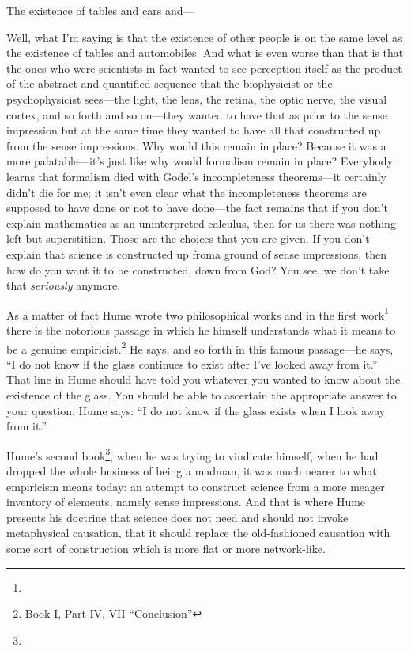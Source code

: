  The existence of tables and cars and--- 

 Well, what I'm saying is that the existence of other people is on 
the same level as the existence of tables and automobiles. And what is 
even worse than that is that the ones who were scientists in fact wanted 
to see perception itself as the product of the abstract and quantified 
sequence that the biophysicist or the psychophysicist sees---the light, 
the lens, the retina, the optic nerve, the visual cortex, and so forth and 
so on---they wanted to have that as prior to the sense impression but at 
the same time they wanted to have all that constructed up from the 
sense impressions. Why would this remain in place? Because it was a 
more palatable---it's just like why would formalism remain in place? 
Everybody learns that formalism died with Godel's incompleteness 
theorems---it certainly didn't die for me; it isn't even clear what the 
incompleteness theorems are supposed to have done or not to have 
done---the fact remains that if you don't explain mathematics as an 
uninterpreted calculus, then for us there was nothing left but 
superstition. Those are the choices that you are given. If you don't explain that 
science is constructed up froma ground of sense impressions, then how 
do you want it to be constructed, down from God? You see, we don't 
take that \emph{seriously} anymore. 

As a matter of fact Hume wrote two philosophical works and in 
the first work\footnote{}
there is the notorious passage in which he himself 
understands what it means to be a genuine empiricist.\footnote{Book I, Part IV, VII \enquote{Conclusion}}
He says,  and so forth in this famous 
passage---he says, 
\enquote{I do not know if the glass continues to exist after I've looked away from it.} 
That line in Hume should have told you 
whatever you wanted to know about the existence of the glass. You 
should be able to ascertain the appropriate answer to your question. 
Hume says: \enquote{I do not know if the glass exists when I look away from it.} 

Hume's second book\footnote{}, 
when he was trying to vindicate himself, 
when he had dropped the whole business of being a madman, it was 
much nearer to what empiricism means today: an attempt to construct 
science from a more meager inventory of elements, namely sense 
impressions. And that is where Hume presents his doctrine that science 
does not need and should not invoke metaphysical causation, that it 
should replace the old-fashioned causation with some sort of construction 
which is more flat or more network-like. 

